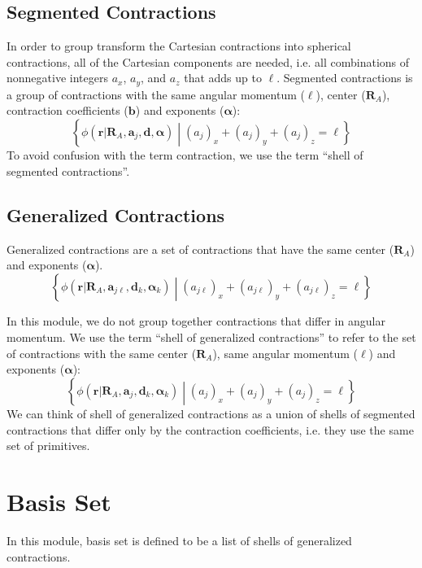 \documentclass[letterpaper]{article}
\begin{document}
\subsection{Segmented Contractions}
In order to group transform the Cartesian contractions into spherical
contractions, all of the Cartesian components are needed, i.e. all
combinations of nonnegative integers $a_x$, $a_y$, and $a_z$ that adds up to
$\ell$.
Segmented contractions is a group of contractions with the same angular momentum
($\ell$), center ($\mathbf{R}_A$), contraction coefficients ($\mathbf{b}$) and
exponents ($\boldsymbol{\alpha}$):
\begin{equation}
  \label{eq:seg_contraction}
  \left\{
    \phi (\mathbf{r} | \mathbf{R}_A, \mathbf{a}_j, \mathbf{d}, \boldsymbol{\alpha})
    \middle|
    (a_j)_x + (a_j)_y + (a_j)_z = \ell
  \right\}
\end{equation}
To avoid confusion with the term contraction, we use the term ``shell of
segmented contractions''.

\subsection{Generalized Contractions}
Generalized contractions are a set of contractions that have the same center
($\mathbf{R}_A$) and exponents
($\boldsymbol{\alpha}$).
\begin{equation}
  \label{eq:gen_contraction}
  \left\{
    \phi (\mathbf{r} | \mathbf{R}_A, \mathbf{a}_{j\ell}, \mathbf{d}_k, \boldsymbol{\alpha}_k)
    \middle|
    (a_{j\ell})_x + (a_{j\ell})_y + (a_{j\ell})_z = \ell
  \right\}
\end{equation}

In this module, we do not group together contractions that differ in angular momentum.
We use the term ``shell of generalized contractions'' to refer to the set of
contractions with the same center ($\mathbf{R}_A$), same angular momentum
($\ell$) and exponents ($\boldsymbol{\alpha}$):
\begin{equation}
  \label{eq:gen_contraction}
  \left\{
    \phi (\mathbf{r} | \mathbf{R}_A, \mathbf{a}_j, \mathbf{d}_k, \boldsymbol{\alpha}_k)
    \middle|
    (a_j)_x + (a_j)_y + (a_j)_z = \ell
  \right\}
\end{equation}
We can think of shell of generalized contractions as a union of shells of
segmented contractions that differ only by the contraction coefficients, i.e.
they use the same set of primitives.

\section{Basis Set}
In this module, basis set is defined to be a list of shells of generalized
contractions.
\end{document}
